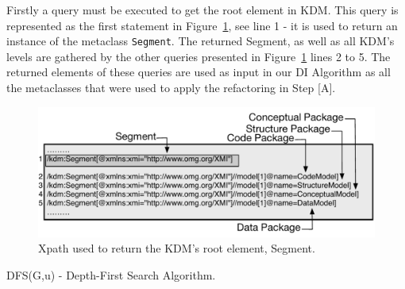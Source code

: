 
Firstly a query must be executed to get the root element in KDM. This query is represented as the first statement in Figure~\ref{fig:queriesXPath}, see line 1 - it is used to return an instance of the metaclass \texttt{Segment}. The returned Segment, as well as all KDM's levels are gathered by the other queries presented in Figure~\ref{fig:queriesXPath} lines 2 to 5. The returned elements of these queries are used as input in our DI Algorithm as all the metaclasses that were used to apply the refactoring in Step [A].

\begin{figure}[h]
	\centering
	\includegraphics[scale=0.479]{figuras/queiresANDATLSBESNew}
	\caption{Xpath used to return the KDM's root element, Segment.}
	\label{fig:queriesXPath}
\end{figure}


\begin{algorithm}[h]
     \SetAlgoLined
     \caption{DFS(G,u) - Depth-First Search Algorithm.}
     \label{alg:death1}
   \end{algorithm}

